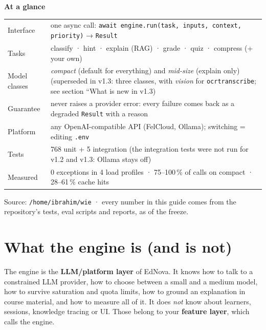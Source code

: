 \documentclass[11pt,a4paper]{article}
\renewcommand{\_}{\origus\allowbreak}
\begin{document}
\begin{titlepage}
\vspace{1.4cm}
\begin{tcolorbox}[colback=mist,colframe=navy,boxrule=0.4pt,arc=2pt,width=0.92\textwidth,
  fontupper=\sffamily\small,left=10pt,right=10pt,top=8pt,bottom=8pt]
\textbf{\color{navy}At a glance}\par\smallskip
\begin{tabularx}{\linewidth}{@{}lX@{}}
Interface & one async call: \texttt{await engine.run(task, inputs, context, priority)} → \texttt{Result}\\
Tasks & classify · hint · explain (RAG) · grade · quiz · compress (+ your own)\\
Model classes & \textit{compact} (default for everything) and \textit{mid-size} (explain only) (superseded in v1.3: three classes, with \textit{vision} for \texttt{ocr\_transcribe}; see section ``What is new in v1.3)\\
Guarantee & never raises a provider error: every failure comes back as a degraded \texttt{Result} with a reason\\
Platform & any OpenAI-compatible API (FelCloud, Ollama); switching = editing \texttt{.env}\\
Tests & 768 unit + 5 integration (the integration tests were not run for v1.2 and v1.3: Ollama stays off)\\
Measured & 0 exceptions in 4 load profiles · 75–100\,\% of calls on compact · 28–61\,\% cache hits\\
\end{tabularx}
\end{tcolorbox}
\vfill
{\sffamily\small\color{slate} Source: \texttt{/home/ibrahim/wie} · every number in this guide comes from the
repository's tests, eval scripts and reports, as of the freeze.}
\end{titlepage}

\tableofcontents
\newpage

\section{What the engine is (and is not)}

The engine is the \textbf{LLM/platform layer} of EdNova. It knows how to talk to a constrained LLM
provider, how to choose between a small and a medium model, how to survive saturation and quota
limits, how to ground an explanation in course material, and how to measure all of it. It does
\emph{not} know about learners, sessions, knowledge tracing or UI. Those belong to your
\textbf{feature layer}, which calls the engine.
\end{document}
